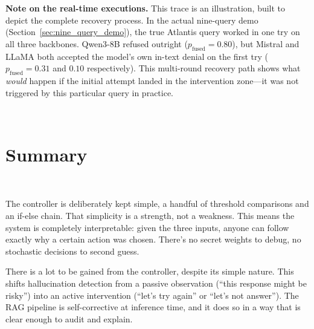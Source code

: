 \textbf{Note on the real-time executions.} This trace is an illustration, built to depict the complete recovery process. In the actual nine-query demo (Section~\ref{sec:nine_query_demo}), the true Atlantis query worked in one try on all three backbones. Qwen3-8B refused outright ($p_{\text{fused}} = 0.80$), but Mistral and LLaMA both accepted the model's own in-text denial on the first try ($p_{\text{fused}} = 0.31$ and $0.10$ respectively). This multi-round recovery path shows what \emph{would} happen if the initial attempt landed in the intervention zone—it was not triggered by this particular query in practice.

 \section{Summary} 
\label{sec:ch7_summery}

The controller is deliberately kept simple, a handful of threshold comparisons and an if-else chain.  That simplicity is a strength, not a weakness. This means the system is completely interpretable: given the three inputs, anyone can follow exactly why a certain action was chosen. There's no secret weights to debug, no stochastic decisions to second guess.

There is a lot to be gained from the controller, despite its simple nature. This shifts hallucination detection from a passive observation (``this response might be risky'') into an active intervention (``let's try again'' or ``let's not answer''). The RAG pipeline is self-corrective at inference time, and it does so in a way that is clear enough to audit and explain.
